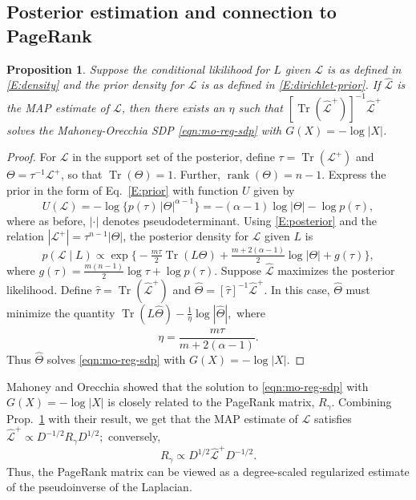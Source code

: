 \documentclass[12pt]{article}
\DeclareMathOperator*{\Tr}{Tr}
\DeclareMathOperator*{\rank}{rank}
\theoremstyle{plain}
\newtheorem{proposition}[theorem]{Proposition}
\begin{document}
\subsection{Posterior estimation and connection to PageRank}
\label{S:posterior-density}

\begin{proposition}\label{P:map-sdp}
  Suppose the conditional likilihood for $L$ given $\mathcal{L}$ is as
  defined in \eqref{E:density} and the prior density for $\mathcal{L}$
  is as defined in \eqref{E:dirichlet-prior}.  If
  $\mathcal{\hat L}$ is the MAP estimate of $\mathcal{L}$, then
  there exists an $\eta$ such that
  $[\Tr(\mathcal{\hat L}^+)]^{-1} \mathcal{\hat L}^+$ solves the
  Mahoney-Orecchia SDP \eqref{eqn:mo-reg-sdp} with $G(X) = -\log |X|$.
\end{proposition}

\begin{proof}
For $\mathcal{L}$ in the support set of the posterior,
define $\tau = \Tr(\mathcal{L}^+)$ and $\Theta  = \tau^{-1}
\mathcal{L}^+$, so that $\Tr(\Theta) = 1$.  Further, $\rank(\Theta) = n - 1$.
Express the prior in the form of Eq.~\eqref{E:prior} with function
$U$ given by
\[
  U(\mathcal{L})
    = -\log \{ p(\tau) \, |\Theta|^{\alpha - 1} \}
    = -(\alpha - 1) \log |\Theta| - \log p(\tau),
\]
where as before, $|\cdot|$ denotes pseudodeterminant.  Using
\eqref{E:posterior} and the relation
$|\mathcal{L}^+| = \tau^{n-1} |\Theta|$, the posterior
density for $\mathcal{L}$ given $L$ is
\[
  p(\mathcal{L} \mid L)
    \propto
      \exp\Big\{
        -\tfrac{m \tau}{2} \Tr(L \Theta)
        +\tfrac{m + 2(\alpha - 1)}{2} \log | \Theta |
        + g(\tau)\Big\},
\]
where
\(
  g(\tau)
    = \tfrac{m (n-1)}{2} \log \tau
        + \log p(\tau).
\)
Suppose $\mathcal{\hat L}$ maximizes the
posterior likelihood.  Define $\hat \tau = \Tr(\mathcal{\hat L}^+)$
and $\hat \Theta = [\hat \tau]^{-1} \mathcal{\hat L}^{+}$.
In this case, $\hat \Theta$ must minimize the quantity
\(
  \Tr(L \hat \Theta) - \tfrac{1}{\eta} \log |\hat \Theta|,
\)
where
\begin{equation}\label{E:eta}
  \eta
    = \frac{m \hat \tau}{m + 2(\alpha - 1)}.
\end{equation}
Thus $\hat \Theta$ solves \eqref{eqn:mo-reg-sdp} with $G(X) = - \log |X|$.
\end{proof}

Mahoney and Orecchia showed that the solution to
\eqref{eqn:mo-reg-sdp} with $G(X) = - \log |X|$
is closely related to the PageRank matrix, $R_\gamma$.  Combining
Prop.~\ref{P:map-sdp} with their result, we get that the MAP estimate
of $\mathcal{L}$ satisfies
\(
  \mathcal{\hat L}^+
    \propto D^{-1/2} R_\gamma D^{1/2};
\)
conversely,
\[
  R_\gamma
    \propto
      D^{1/2} \mathcal{\hat L}^+ D^{-1/2}.
\]
Thus, the PageRank matrix
can be viewed as a degree-scaled regularized estimate of the
pseudoinverse of the Laplacian.
\end{document}
